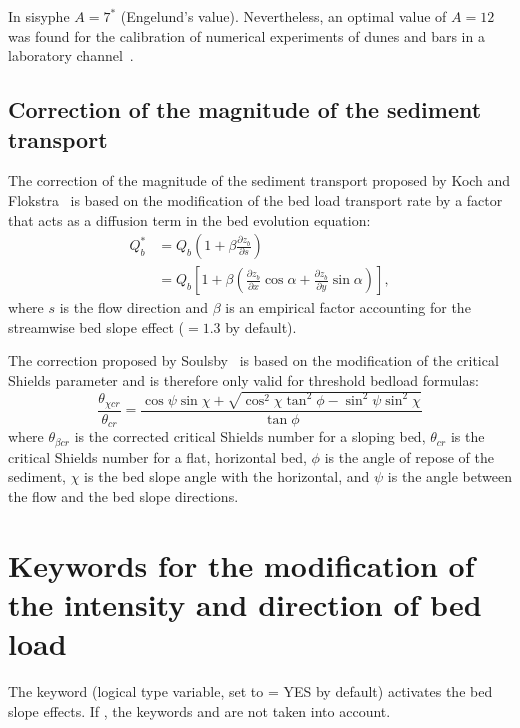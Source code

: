 In sisyphe{} $A=7^*$ (Engelund's value). Nevertheless, an optimal value of $A=12$ was found for the calibration of numerical experiments of dunes and bars in a laboratory channel~\cite{Mendoza15}.

\subsection{Correction of the magnitude of the sediment transport}
The correction of the magnitude of the sediment transport proposed by Koch and Flokstra~\cite{KochFlokstra80} is based on the modification of the bed load transport rate by a factor that acts as a diffusion term in the bed evolution equation:
\begin{equation}
\begin{array}{ll} \displaystyle
Q_b^* &= Q_{b}\left(1+\beta\frac{\partial z_b}{\partial s}\right) \\
    &= Q_{b}\left[1 + \beta \left(\frac{\partial z_b}{\partial x} \cos\alpha + \frac{\partial z_b}{\partial y} \sin\alpha\right)\right],
\end{array}
\end{equation}
where $s$ is the flow direction and $\beta$ is an empirical factor accounting for the streamwise bed slope effect ($=1.3$ by default).

The correction proposed by Soulsby~\cite{Soulsby97} is based on the modification of the critical Shields parameter and is therefore only valid for threshold bedload formulas:
\begin{equation*}
\frac{\theta_{\chi cr}}{\theta_{cr}} = \frac{\cos\psi \sin\chi + 
\sqrt{\cos^2\chi \tan^2\phi - \sin^2\psi \sin^2\chi}}{\tan
\phi}
\end{equation*}
where $\theta_{\beta cr}$ is the corrected critical Shields number for a sloping bed, $\theta_{cr}$ is the critical Shields number for a flat, horizontal bed, $\phi$ is the angle of repose of the sediment, $\chi$ is the bed slope angle with the horizontal, and $\psi$ is the angle between the flow and the bed slope directions.

\section{Keywords for the modification of the intensity and direction of bed load}
The keyword  (logical type variable, set to {\ttfamily = YES} by default) activates the bed slope effects. If , the keywords  and  are not taken into account.

